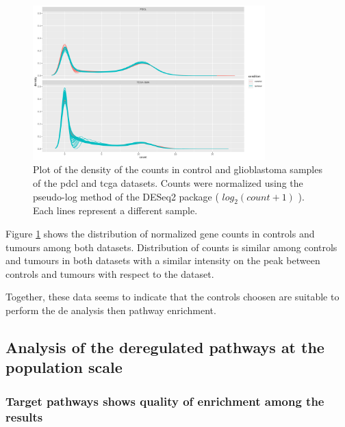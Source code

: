 \begin{figure}
    \begin{center}
        \includegraphics[width=0.8\textwidth]{img/density_plot}
        \caption{
            Plot of the density of the counts in control and glioblastoma samples of the \acrshort{pdcl} and \acrshort{tcga} datasets.
            Counts were normalized using the pseudo-log method of the DESeq2 package ( $log_2(count+1)$ ).
            Each lines represent a different sample.
        }
        \label{fig:density-plot}
    \end{center}
\end{figure}

Figure \ref*{fig:density-plot} shows the distribution of normalized gene counts in controls and tumours among both datasets.
Distribution of counts is similar among controls and tumours in both datasets with a similar intensity on the peak between controls and tumours with respect to the dataset.

Together, these data seems to indicate that the controls choosen are suitable to perform the \acrlong{de} analysis then pathway enrichment.

\subsection{Analysis of the deregulated pathways at the population scale}

\subsubsection{Target pathways shows quality of enrichment among the results}

